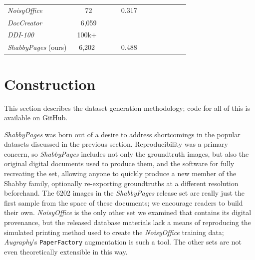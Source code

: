 \documentclass[runningheads]{llncs}
\newcommand{\cmark}{{\color{ForestGreen}\ding{51}}}%
\newcommand{\xmark}{{\color{Maroon}\ding{55}}}%
\begin{document}
\begin{table}[]
\begin{tabular}{lcllllllll}
         \midrule
         \emph{NoisyOffice} \cite{ref_NoisyOffice} & 72  & \cmark & \cmark & 0.317 & \cmark & \xmark & \xmark & \xmark & \xmark \\
         \emph{DocCreator} \cite{ref_DocCreator} & 6,059 & \cmark & \cmark & & \cmark & \cmark & \cmark & \xmark &\cmark\\
         \emph{DDI-100} \cite{ddi-100-2019} & 100k+~ & \cmark & \cmark & & & & & & \xmark\\
         \emph{ShabbyPages} (ours)~ & 6,202~ & \cmark & \cmark & 0.488~ & \cmark~ & \cmark~ & \cmark & \cmark & \cmark \\
         \bottomrule
    \end{tabular}
\end{table}

\section{Construction}
This section describes the dataset generation methodology; code for all of this is available on GitHub.

\emph{ShabbyPages} was born out of a desire to address shortcomings in the popular datasets discussed in the previous section.
Reproducibility was a primary concern, so \emph{ShabbyPages} includes not only the groundtruth images, but also the original digital documents used to produce them, and the software for fully recreating the set, allowing anyone to quickly produce a new member of the Shabby family, optionally re-exporting groundtruths at a different resolution beforehand.
The 6202 images in the \emph{ShabbyPages} release set are really just the first sample from the space of these documents; we encourage readers to build their own.
\emph{NoisyOffice} is the only other set we examined that contains its digital provenance, but the released database materials lack a means of reproducing the simulated printing method used to create the \emph{NoisyOffice} training data; \emph{Augraphy}'s \texttt{PaperFactory} augmentation is such a tool.
The other sets are not even theoretically extensible in this way.
\end{document}
